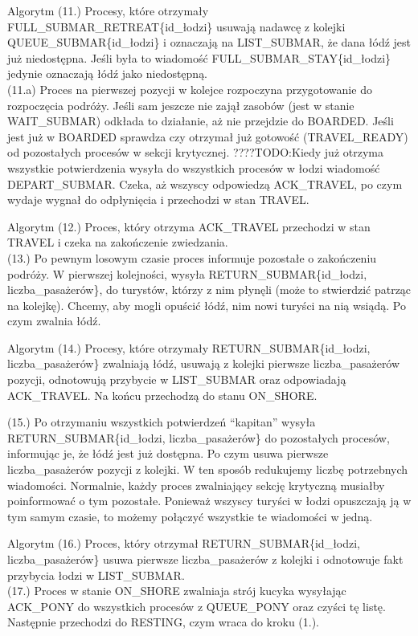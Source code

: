 \documentclass{beamer}
\begin{document}
\begin{frame}{Algorytm}
    \internallinenumbers
    (11.) Procesy, które otrzymały FULL\_SUBMAR\_RETREAT\{id\_łodzi\} usuwają nadawcę z kolejki QUEUE\_SUBMAR\{id\_łodzi\} i oznaczają na LIST\_SUBMAR, że dana łódź jest już niedostępna. Jeśli była to wiadomość FULL\_SUBMAR\_STAY\{id\_łodzi\} jedynie oznaczają łódź jako niedostępną. \\

    (11.a) Proces na pierwszej pozycji w kolejce rozpoczyna przygotowanie do rozpoczęcia podróży. Jeśli sam jeszcze nie zajął zasobów (jest w stanie WAIT\_SUBMAR) odkłada to działanie, aż nie przejdzie do BOARDED. Jeśli jest już w BOARDED sprawdza czy otrzymał już gotowość (TRAVEL\_READY) od pozostałych procesów w sekcji krytycznej. 
    ????TODO:Kiedy już otrzyma wszystkie potwierdzenia wysyła do wszystkich procesów w łodzi wiadomość DEPART\_SUBMAR. Czeka, aż wszyscy odpowiedzą ACK\_TRAVEL, po czym wydaje wygnał do odpłynięcia i przechodzi w stan TRAVEL.
\end{frame}

\begin{frame}{Algorytm}
    \internallinenumbers
    (12.) Proces, który otrzyma ACK\_TRAVEL przechodzi w stan TRAVEL i czeka na zakończenie zwiedzania. \\

    (13.) Po pewnym losowym czasie proces informuje pozostałe o zakończeniu podróży. W pierwszej kolejności, wysyła RETURN\_SUBMAR\{id\_łodzi, liczba\_pasażerów\}, do turystów, którzy z nim płynęli (może to stwierdzić patrząc na kolejkę). Chcemy, aby mogli opuścić łódź, nim nowi turyści na nią wsiądą. Po czym zwalnia łódź.
\end{frame}

\begin{frame}{Algorytm}
    \internallinenumbers
    (14.) Procesy, które otrzymały RETURN\_SUBMAR\{id\_łodzi, liczba\_pasażerów\} zwalniają łódź, usuwają z kolejki pierwsze liczba\_pasażerów pozycji, odnotowują przybycie w LIST\_SUBMAR oraz odpowiadają ACK\_TRAVEL. Na końcu przechodzą do stanu ON\_SHORE.

    (15.) Po otrzymaniu wszystkich potwierdzeń ``kapitan'' wysyła RETURN\_SUBMAR\{id\_łodzi, liczba\_pasażerów\} do pozostałych procesów, informując je, że łódź jest już dostępna. Po czym usuwa pierwsze liczba\_pasażerów pozycji z kolejki. W ten sposób redukujemy liczbę potrzebnych wiadomości. Normalnie, każdy proces zwalniający sekcję krytyczną musiałby poinformować o tym pozostałe. Ponieważ wszyscy turyści w łodzi opuszczają ją w tym samym czasie, to możemy połączyć wszystkie te wiadomości w jedną.
\end{frame}

\begin{frame}{Algorytm}
    \internallinenumbers
    (16.) Proces, który otrzymał RETURN\_SUBMAR\{id\_łodzi, liczba\_pasażerów\} usuwa pierwsze liczba\_pasażerów z kolejki i odnotowuje fakt przybycia łodzi w LIST\_SUBMAR.\\
    (17.) Proces w stanie ON\_SHORE zwalniaja strój kucyka wysyłając ACK\_PONY do wszystkich procesów z QUEUE\_PONY oraz czyści tę listę. Następnie przechodzi do RESTING, czym wraca do kroku (1.).
\end{frame}
\end{document}
